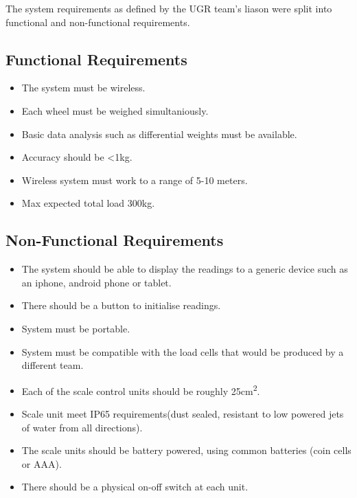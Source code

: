 The system requirements as defined by the UGR team's liason were split into functional and non-functional requirements.

\subsection{Functional Requirements}
\label{functional}
\begin{itemize}
\item The system must be wireless.
\item Each wheel must be weighed simultaniously.
\item Basic data analysis such as differential weights must be available.
\item Accuracy should be \textless 1kg.
\item Wireless system must work to a range of 5-10 meters.
\item Max expected total load 300kg.
\end{itemize}

\subsection{Non-Functional Requirements}
\label{non-functional}
\begin{itemize}
\item The system should be able to display the readings to a generic device such as an iphone, android phone or tablet. 
\item There should be a button to initialise readings.
\item System must be portable.
\item System must be compatible with the load cells that would be produced by a different team.
\item Each of the scale control units should be roughly 25cm\textsuperscript{2}.
\item Scale unit meet IP65 requirements(dust sealed, resistant to low powered jets of water from all directions).
\item The scale units should be battery powered, using common batteries (coin cells or AAA).
\item There should be a physical on-off switch at each unit.
\end{itemize}
